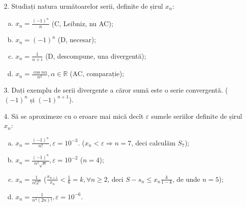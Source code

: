 \documentclass[11pt,a4paper]{article}
\newcommand\RR{\mathbb{R}}
\theoremstyle{dotless}
\theoremstyle{dotlessdr}
\begin{document}
\vspace{1cm}

2. Studiați natura următoarelor serii, definite de șirul $x_n$:
\begin{enumerate}[(a)]
  \item $x_n = \frac{(-1)^n}{n}$ (C, Leibniz, nu AC);
  \item $x_n = (-1)^n$ (D, necesar);
  \item $x_n = \frac{1}{n + i}$ (D, descompune, una divergentă);
  \item $x_n = \frac{\cos n \alpha}{n^2}, \alpha \in \RR$ (AC, comparație);
\end{enumerate}

\vspace{1cm}

3. Dați exemplu de serii divergente a căror sumă este o serie convergentă.
($(-1)^n$ și $(-1)^{n + 1}$).

\vspace{1cm}

4. Să se aproximeze cu o eroare mai mică decît $\varepsilon$ sumele
seriilor definite de șirul $x_n$:
\begin{enumerate}[(a)]
  \item $x_n = \frac{(-1)^n}{n!}, \varepsilon = 10^{-3}$. ($x_n < \varepsilon \Rightarrow n = 7$,
    deci calculăm $S_7$);
  \item $x_n = \frac{(-1)^n}{n^3 \sqrt{n}}, \varepsilon = 10^{-2}$ ($n = 4$);
  \item $x_n = \frac{1}{n! 2^n}$ ($\frac{x_{n + 1}}{x_n} < \frac{1}{6} = k, \forall n \geq 2$,
    deci $S - s_n \leq x_n \frac{k}{1 - k}$, de unde $n = 5$);
  \item $x_n = \frac{1}{n^4 (2n)!}, \varepsilon = 10^{-6}$.
\end{enumerate}
\end{document}

